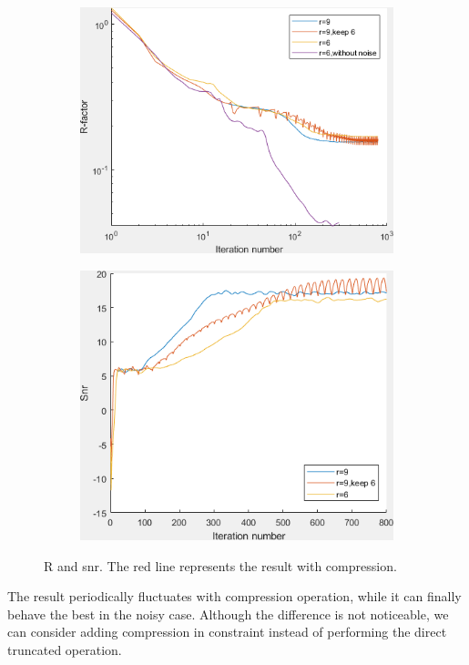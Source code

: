 \documentclass{article}
\numberwithin{equation}{section}
\begin{document}
  \begin{figure}
  \begin{subfigure}{.5\textwidth}
    \centering
    \includegraphics[width=0.9\linewidth]{figures/noise_R.png}  
    \label{fig:noise_R}
  \end{subfigure}
  \begin{subfigure}{.5\textwidth}
    \centering
    \includegraphics[width=.8\linewidth]{figures/noise_snr.png}  
    \label{fig:noise_snr}
  \end{subfigure}
  \caption{R and snr. The red line represents the result with compression.}
  \label{fig:noise}
  \end{figure}
 
  The result periodically fluctuates with compression operation, while it can finally behave the best in the noisy case. Although the difference is not noticeable, we can consider adding compression in constraint instead of performing the direct truncated operation.
  
\end{document}
